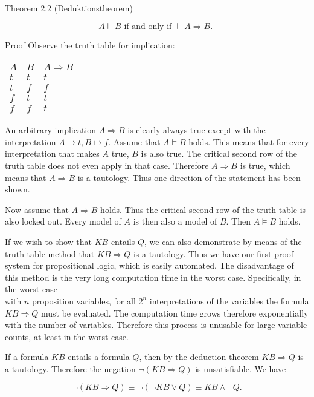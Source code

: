 \documentclass[10pt]{article}
\begin{document}
Theorem 2.2 (Deduktionstheorem)

$$
A \models B \text { if and only if } \models A \Rightarrow B \text {. }
$$

Proof Observe the truth table for implication:

\begin{center}
\begin{tabular}{lll}
\hline
$A$ & $B$ & $A \Rightarrow B$ \\
\hline
$t$ & $t$ & $t$ \\
\hline
$t$ & $f$ & $f$ \\
\hline
$f$ & $t$ & $t$ \\
\hline
$f$ & $f$ & $t$ \\
\hline
\end{tabular}
\end{center}

An arbitrary implication $A \Rightarrow B$ is clearly always true except with the interpretation $A \longmapsto t, B \longmapsto f$. Assume that $A \models B$ holds. This means that for every interpretation that makes $A$ true, $B$ is also true. The critical second row of the truth table does not even apply in that case. Therefore $A \Rightarrow B$ is true, which means that $A \Rightarrow B$ is a tautology. Thus one direction of the statement has been shown.

Now assume that $A \Rightarrow B$ holds. Thus the critical second row of the truth table is also locked out. Every model of $A$ is then also a model of $B$. Then $A \models B$ holds.

If we wish to show that $K B$ entails $Q$, we can also demonstrate by means of the truth table method that $K B \Rightarrow Q$ is a tautology. Thus we have our first proof system for propositional logic, which is easily automated. The disadvantage of this method is the very long computation time in the worst case. Specifically, in the worst case\\
with $n$ proposition variables, for all $2^{n}$ interpretations of the variables the formula $K B \Rightarrow Q$ must be evaluated. The computation time grows therefore exponentially with the number of variables. Therefore this process is unusable for large variable counts, at least in the worst case.

If a formula $K B$ entails a formula $Q$, then by the deduction theorem $K B \Rightarrow Q$ is a tautology. Therefore the negation $\neg(K B \Rightarrow Q)$ is unsatisfiable. We have

$$
\neg(K B \Rightarrow Q) \equiv \neg(\neg K B \vee Q) \equiv K B \wedge \neg Q .
$$
\end{document}
